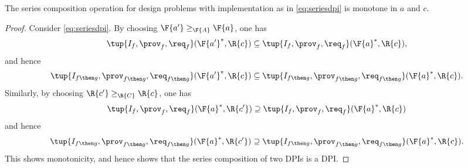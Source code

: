\begin{lemma}
The series composition operation for design problems with implementation as in \cref{eq:seriesdpi} is monotone in $a$ and $c$.
\end{lemma}
\begin{proof}
Consider \cref{eq:seriesdpi}. By choosing $\F{a'}\geq_\F{A} \F{a}$, one has 
\begin{equation}
    \tup{I_{f},\prov_{f},\req_{f}}(\F{a'}^*,\R{c})\subseteq \tup{I_{f},\prov_{f},\req_{f}}(\F{a}^*,\R{c}),
\end{equation}
and hence
\begin{equation}
    \tup{I_{f\then g},\prov_{f\then g},\req_{f\then g}}(\F{a'}^*,\R{c})\subseteq \tup{I_{f\then g},\prov_{f\then g},\req_{f\then g}}(\F{a}^*,\R{c}).
\end{equation}
Similarly, by choosing $\R{c'}\geq_{\R{C}} \R{c}$, one has
\begin{equation}
    \tup{I_{f},\prov_{f},\req_{f}}(\F{a}^*,\R{c'})\supseteq \tup{I_{f},\prov_{f},\req_{f}}(\F{a}^*,\R{c})
\end{equation}
and hence
\begin{equation}
    \tup{I_{f\then g},\prov_{f\then g},\req_{f\then g}}(\F{a}^*,\R{c'})\supseteq \tup{I_{f\then g},\prov_{f\then g},\req_{f\then g}}(\F{a}^*,\R{c}).
\end{equation}
This shows monotonicity, and hence shows that the series composition of two DPIs is a DPI.
\end{proof}

